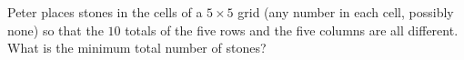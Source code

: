 Peter places stones in the cells of a $5\times5$ grid (any number in each cell, possibly none) so that the $10$ totals of the five rows and the five columns are all different. What is the minimum total number of stones?
